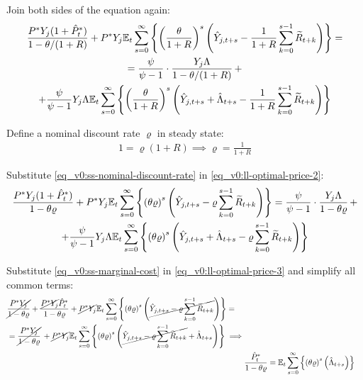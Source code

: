 \documentclass[../thesis.tex]{subfiles}
\begin{document}
	Join both sides of the equation again:
	\begin{multline}
		\frac{ P^\ast Y_{j} ( 1 + \hat{P}_t^\ast ) }{1-\theta /(1+R)} + P^\ast Y_{j} {\mathbb{E}_{t}} \sum_{s=0}^{\infty} \left\{ \left( \frac{\theta}{1 + R} \right)^s \left( \hat{Y}_{j,t+s} - \frac{1}{1 + R} \sum_{k=0}^{s-1} \widetilde{R}_{t+k} \right) \right\} = 
		\\
		= \frac{\psi}{\psi-1} \cdot \frac{Y_{j} \Lambda}{1-\theta /(1+R)} \, + 
		\\
		+ \frac{\psi}{\psi-1} Y_{j} \Lambda {\mathbb{E}_{t}} \sum_{s=0}^{\infty} \left\{ \left( \frac{\theta}{1 + R} \right)^s \left( \hat{Y}_{j,t+s} + \hat{\Lambda}_{t+s} - \frac{1}{1 + R} \sum_{k=0}^{s-1} \widetilde{R}_{t+k} \right) \right\} \label{eq_v0:ll-optimal-price-2}
	\end{multline}
	
	Define a nominal discount rate $\varrho$ in steady state:
	\begin{align}
		1 = \varrho (1 + R) \implies \varrho = \frac{1}{1 + R} \label{eq_v0:ss-nominal-discount-rate}
	\end{align}
	
	Substitute \ref{eq_v0:ss-nominal-discount-rate} in \ref{eq_v0:ll-optimal-price-2}:
	\begin{multline}
		\frac{ P^\ast Y_{j} ( 1 + \hat{P}_t^\ast ) }{1- \theta \varrho} + P^\ast Y_{j} {\mathbb{E}_{t}} \sum_{s=0}^{\infty} \left\{ \left( \theta \varrho \right)^s \left( \hat{Y}_{j,t+s} - \varrho \sum_{k=0}^{s-1} \widetilde{R}_{t+k} \right) \right\} = \frac{\psi}{\psi-1} \cdot \frac{Y_{j} \Lambda}{1- \theta \varrho } \, + 
		\\ 
		+ \frac{\psi}{\psi-1} Y_{j} \Lambda {\mathbb{E}_{t}} \sum_{s=0}^{\infty} \left\{ \left( \theta \varrho \right)^s \left( \hat{Y}_{j,t+s} + \hat{\Lambda}_{t+s} - \varrho \sum_{k=0}^{s-1} \widetilde{R}_{t+k} \right) \right\} \label{eq_v0:ll-optimal-price-3}
	\end{multline}
	
	Substitute \ref{eq_v0:ss-marginal-cost} in \ref{eq_v0:ll-optimal-price-3} and simplify all common terms:
	\begin{align}
		\begin{split}
			& \cancel{\frac{P^\ast Y_{j}}{1-\theta\varrho}} + \frac{ \cancel{P^\ast Y_{j}} \hat{P}_t^\ast }{1- \theta \varrho} + \cancel{P^\ast Y_{j}} {\mathbb{E}_{t}} \sum_{s=0}^{\infty} \left\{ \left( \theta \varrho \right)^s \left( \cancel{\hat{Y}_{j,t+s} - \varrho \sum_{k=0}^{s-1} \widetilde{R}_{t+k}} \right) \right\} = 
			\\
			& = \cancel{\frac{P^\ast Y_{j}}{1-\theta\varrho}} \, + \cancel{P^\ast Y_{j}} {\mathbb{E}_{t}} \sum_{s=0}^{\infty} \left\{ \left( \theta \varrho \right)^s \left( \cancel{\hat{Y}_{j,t+s} - \varrho \sum_{k=0}^{s-1} \widetilde{R}_{t+k}} + \hat{\Lambda}_{t+s} \right) \right\} \implies	
		\end{split} \nonumber \\
		& \frac{ \hat{P}_t^\ast }{1- \theta \varrho} = {\mathbb{E}_{t}} \sum_{s=0}^{\infty} \left\{ \left( \theta \varrho \right)^s \left( \hat{\Lambda}_{t+s} \right) \right\} \label{eq_v0:ll-optimal-price-4}
	\end{align}
	
\end{document}
